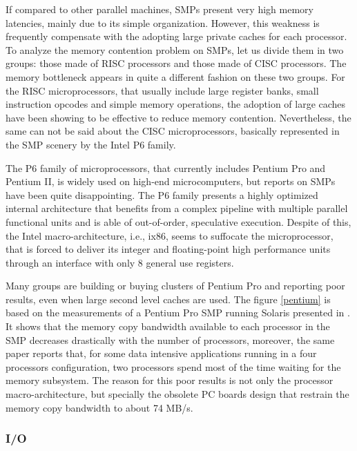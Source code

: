 	If compared to other parallel machines, SMPs present very high memory latencies, mainly due to its simple organization. However, this weakness is frequently compensate with the adopting large private caches for each processor. To analyze the memory contention problem on SMPs, let us divide them in two groups: those made of RISC processors and those made of CISC processors. The memory bottleneck appears in quite a different fashion on these two groups. For the RISC  microprocessors, that usually include large register banks, small instruction opcodes and simple memory operations, the adoption of large caches have been showing to be effective to reduce memory contention. Nevertheless, the same can not be said about the CISC microprocessors, basically represented in the SMP scenery by the Intel P6 family.

	The P6 family of microprocessors, that currently includes Pentium Pro and Pentium II, is widely used on high-end microcomputers, but reports on SMPs  have been quite disappointing. The P6 family presents a highly optimized internal architecture that benefits from a complex pipeline with multiple parallel functional units and is able of out-of-order, speculative execution. Despite of this, the Intel macro-architecture, i.e., ix86, seems to suffocate the microprocessor, that is forced to deliver its integer and floating-point high performance units through an interface with only 8 general use registers.

	Many groups are building or buying clusters of Pentium Pro and reporting poor results, even when large second level caches are used. The figure \ref{pentium} is based on the measurements of a Pentium Pro SMP running Solaris presented in \cite{Tanaka:98}. It shows that the memory copy bandwidth available to each processor in the SMP decreases drastically with the number of processors, moreover, the same paper reports that, for some data intensive applications running in a four processors configuration, two processors spend most of the time waiting for the memory subsystem. The reason for this poor results is not only the processor macro-architecture, but specially the obsolete PC boards design that restrain the memory copy bandwidth to about 74 MB/s.

	

\subsubsection{\label{hard_proc_io}I/O}

